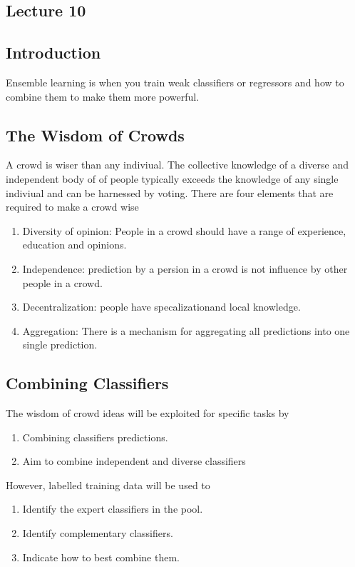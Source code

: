 \documentclass[12pt]{article}
\numberwithin{equation}{section}
\begin{document}
\subsection{Lecture 10}

\subsection{Introduction}

Ensemble learning is when you train weak classifiers or regressors and how to combine them to make them more powerful.

\subsection{The Wisdom of Crowds}
A crowd is wiser than any indiviual. The collective knowledge of a diverse and independent body of of people typically exceeds the knowledge of any single indiviual and can be harnessed by voting. There are four elements that are required to make a crowd wise
\begin{enumerate}
\item
Diversity of opinion: People in a crowd should have a range of experience, education and opinions.
\item
Independence: prediction by a persion in a crowd is not influence by other people in a crowd.
\item 
Decentralization: people have specalizationand local knowledge.
\item
Aggregation: There is a mechanism for aggregating all predictions into one single prediction.
\end{enumerate}
\subsection{Combining Classifiers}
The wisdom of crowd ideas will be exploited for specific tasks by 
\begin{enumerate}
\item
Combining classifiers predictions.
\item
Aim to combine independent and diverse classifiers

\end{enumerate}

However, labelled training data will be used to
\begin{enumerate}
\item
Identify the expert classifiers in the pool.
\item
Identify complementary classifiers.
\item
Indicate how to best combine them.
\end{enumerate}
\end{document}
